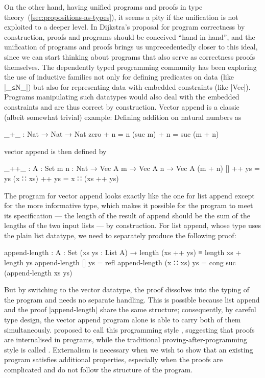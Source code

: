 On the other hand, having unified programs and proofs in type theory~(\autoref{sec:propositions-as-types}), it seems a pity if the unification is not exploited to a deeper level.
In Dijkstra's proposal for program correctness by construction, proofs and programs should be conceived ``hand in hand'', and the unification of programs and proofs brings us unprecedentedly closer to this ideal, since we can start thinking about programs that also serve as correctness proofs themselves.
The dependently typed programming community has been exploring the use of inductive families not only for defining predicates on data (like |_≤N_|) but also for representing data with embedded constraints (like |Vec|).
Programs manipulating such datatypes would also deal with the embedded constraints and are thus correct by construction.
Vector append is a classic (albeit somewhat trivial) example:
Defining addition on natural numbers as
\begin{code}
_+_ : Nat → Nat → Nat
zero     + n = n
(suc m)  + n = suc (m + n)
\end{code}
vector append is then defined by
\begin{code}
_++_ : {A : Set} {m n : Nat} → Vec A m → Vec A n → Vec A (m + n)
[]        ++ ys = ys
(x ∷ xs)  ++ ys = x ∷ (xs ++ ys)
\end{code}
The program for vector append looks exactly like the one for list append except for the more informative type, which makes it possible for the program to meet its specification --- the length of the result of append should be the sum of the lengths of the two input lists --- by construction.
For list append, whose type uses the plain list datatype, we need to separately produce the following proof:
\begin{code}
append-length :
  {A : Set} (xs ys : List A) → length (xs ++ ys) ≡ length xs + length ys
append-length []        ys = refl
append-length (x ∷ xs)  ys = cong suc (append-length xs ys)
\end{code}
But by switching to the vector datatype, the proof dissolves into the typing of the program and needs no separate handling.
This is possible because list append and the proof |append-length| share the same structure; consequently, by careful type design, the vector append program alone is able to carry both of them simultaneously.
\citet{Ko-OAOAOO} proposed to call this programming style , suggesting that proofs are internalised in programs, while the traditional proving-after-programming style is called .
Externalism is necessary when we wish to show that an existing program satisfies additional properties, especially when the proofs are complicated and do not follow the structure of the program.
